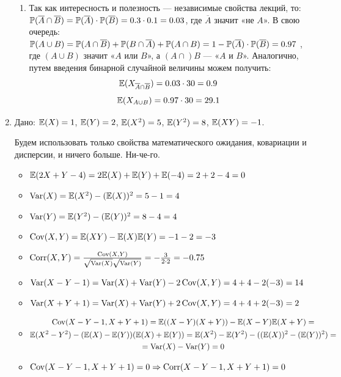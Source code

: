 \documentclass[12pt, a4paper]{article}\usepackage[]{graphicx}\usepackage[]{color}
\begin{document}
\begin{enumerate}
\begin{enumerate}
\item Так как интересность и полезность — независимые свойства лекций, то:\\
 $\P(\overline{A} \cap \overline{B}) = \P(\overline{A})\cdot \P(\overline{B}) = 0.3\cdot0.1 = 0.03$, где $\overline{A}$ значит «не $A$». В свою очередь:\\
 $\P(A\cup B) = \P(A\cap\overline{B}) + \P(B\cap\overline{A}) + \P(A\cap B) = 1 - \P(\overline{A})\cdot \P(\overline{B}) = 0.97$ , где $(A\cup B)$ значит «$A$ или $B$», а $(A\cap)B$ — «$A$ и $B$». Аналогично, путем введения бинарной случайной величины можем получить:
 \[
 \E(X_{\overline{A} \cap \overline{B}}) = 0.03 \cdot  30 = 0.9
 \]
 \[
 \E(X_{A\cup B}) = 0.97\cdot30 = 29.1
\]

\end{enumerate}

\item
Дано: $\E(X) = 1$, $\E(Y) = 2$, $\E(X^2) = 5$, $\E(Y^2) = 8$, $\E(XY) = -1$.

Будем использовать только свойства математического ожидания, ковариации и дисперсии, и ничего больше. Ни-че-го.

\begin{itemize}
\item  $\E(2X + Y - 4) = 2\E(X) + \E(Y) + \E(-4) = 2 + 2 - 4 = 0 $
\item $\Var(X) = \E(X^2) - (\E(X))^2 = 5 - 1 = 4 $
\item $\Var(Y) = \E(Y^2) - (\E(Y))^2 = 8 - 4 = 4 $
\item $\Cov(X, Y) = \E(XY) - \E(X)\E(Y) = -1 - 2 = -3$
\item $\Corr(X, Y) = \frac{\Cov(X, Y)}{\sqrt{\Var(X)}\sqrt{\Var(Y)}} = -\frac{3}{2\cdot 2} = -0.75$
\item $\Var(X-Y-1) = \Var(X) + \Var(Y) - 2\Cov(X, Y) = 4+4 -2(-3) = 14$
\item $\Var(X+Y+1) = \Var(X) + \Var(Y) + 2\Cov(X, Y) = 4+4+2(-3) =2 $
\item \begin{multline}
\Cov(X-Y-1, X+Y+1)=\E((X-Y)(X+Y))-\E(X-Y)\E(X+Y) = \\
\E(X^2-Y^2) - (\E(X)-\E(Y))(\E(X) + \E(Y)) =
\E(X^2) - \E(Y^2) - ((\E(X))^2 -(\E(Y))^2)=\\
 = \Var(X)-\Var(Y) = 0
 \end{multline}
 \item $\Cov(X-Y-1, X+Y+1)=0 \Rightarrow \Corr(X-Y-1, X+Y+1) = 0 $
\end{itemize}


\end{enumerate}
\end{document}
